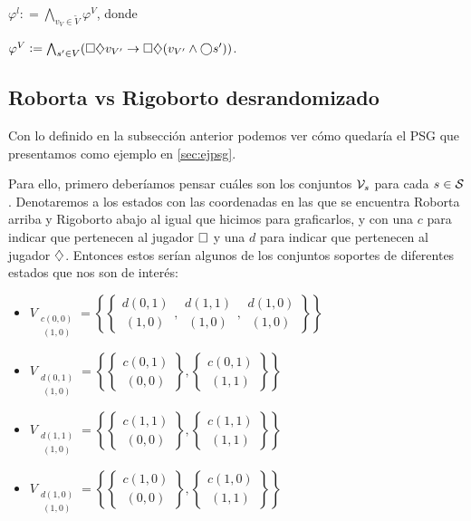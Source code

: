 \begin{center}
	$ \varphi^l : = \bigwedge_{v_V \in \tilde V} \varphi^V $, donde

	$ \varphi^V := \bigwedge_{s' \in V} (\square \diamondsuit v_{V'} \rightarrow \square \diamondsuit (v_{V'} \wedge \bigcirc s' ))$.
\end{center}
\subsection*{Roborta vs Rigoborto desrandomizado}

Con lo definido en la subsección anterior podemos ver cómo quedaría el PSG que
presentamos como ejemplo en \ref{sec:ejpsg}.

Para ello, primero deberíamos pensar cuáles son los conjuntos $\mathcal{V}_s$ para cada
$s \in \mathcal{S}$. Denotaremos a los estados con las coordenadas en las que se
encuentra Roborta arriba y Rigoborto abajo al igual que hicimos para
graficarlos, y con una $c$ para indicar que pertenecen al jugador $\square$ y una
$d$ para indicar que pertenecen al jugador $\diamondsuit$. Entonces estos serían
algunos de los conjuntos soportes de diferentes estados que nos son de interés:
\begin{itemize}
	\item $V_{\substack{c(0,0) \\ \ (1,0)}} = \left\{\left\{\substack{d(0,1) \\ \ (1,0)}, \substack{d(1,1) \\ \ (1,0)}, \substack{d(1,0) \\ \ (1,0)}\right\}\right\}$
	\item $V_{\substack{d(0,1) \\ \ (1,0)}} = \left\{\left\{\substack{c(0,1) \\ \ (0,0)}\right\}, \left\{\substack{c(0,1) \\ \ (1,1)}\right\}\right\}$
	\item $V_{\substack{d(1,1) \\ \ (1,0)}} = \left\{\left\{\substack{c(1,1) \\ \ (0,0)}\right\}, \left\{\substack{c(1,1) \\ \ (1,1)}\right\}\right\}$
	\item $V_{\substack{d(1,0) \\ \ (1,0)}} = \left\{\left\{\substack{c(1,0) \\ \ (0,0)}\right\}, \left\{\substack{c(1,0) \\ \ (1,1)}\right\}\right\}$
\end{itemize}


